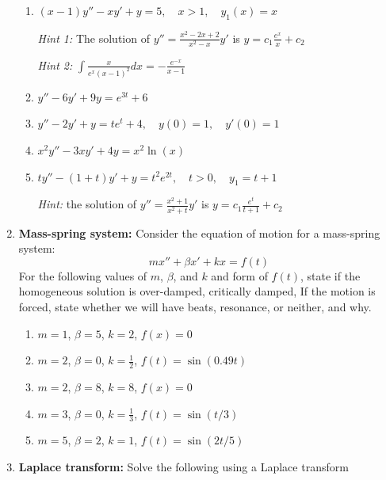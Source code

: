 \documentclass[letterpaper, fontsize=11pt]{scrartcl} %
\numberwithin{equation}{section} %
\numberwithin{figure}{section} %
\numberwithin{table}{section} %
\begin{document}
\begin{enumerate}
\begin{enumerate}
\item $(x-1)y'' -xy' +y=5, \quad x>1,\quad  y_1(x)=x$
\par \textit{Hint 1:} The solution of $y'' = \frac{x^2 - 2x + 2}{x^2 - x}y'$ is $y = c_1\frac{e^x}{x} + c_2$
\par \textit{Hint 2:} $\int \frac{x}{e^x(x - 1)^2}dx = -\frac{e^{-x}}{x-1}$


\item $y'' -6y'+9y=e^{3t} +6$

\item $y'' -2y' +y=te^t +4,\quad y(0) = 1,\quad y'(0) = 1$

\item $x^2y'' -3xy' +4y=x^2 \ln(x)$

\item $ty'' -(1+t)y' +y=t^2e^{2t}, \quad t>0, \quad y_1 = t+1$
\par \textit{Hint:} the solution of $y'' = \frac{x^2+1}{x^2+t}y'$ is $y = c_1\frac{e^t}{t+1} + c_2$

\end{enumerate}


\item \textbf{Mass-spring system:} Consider the equation of motion for a mass-spring system:
\[ mx'' + \beta x' + k x = f(t) \]
For the following values of $m$, $\beta$, and $k$ and form of $f(t)$, state if the homogeneous solution is over-damped, critically damped, If the motion is forced, state whether we will have beats, resonance, or neither, and why.
\begin{enumerate}

\item $m = 1$, $\beta = 5$, $k = 2$, $f(x) = 0$

\item $m = 2$, $\beta = 0$, $k = \frac{1}{2}$, $f(t) = \sin(0.49t)$

\item $m = 2$, $\beta = 8$, $k = 8$, $f(x) = 0$

\item $m = 3$, $\beta = 0$, $k = \frac{1}{3}$, $f(t) = \sin(t/3)$

\item $m = 5$, $\beta = 2$, $k = 1$, $f(t) = \sin(2t/5)$

\end{enumerate}


\item \textbf{Laplace transform:} Solve the following using a Laplace transform
\begin{enumerate}


\end{enumerate}
\end{enumerate}
\end{document}
